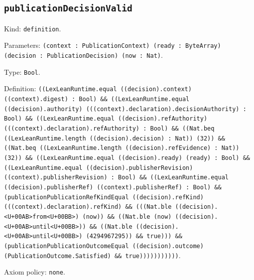 \documentclass[11pt]{article}
\begin{document}
\subsection*{\texttt{publicationDecisionValid}}
\noindent Kind: \texttt{definition}.\par
\noindent Parameters: \texttt{(context : PublicationContext) (ready : ByteArray) (decision : PublicationDecision) (now : Nat)}.\par
\noindent Type: \texttt{Bool}.\par
\noindent Definition: \texttt{((LexLeanRuntime.equal ((decision).context) ((context).digest) : Bool) \&\& ((LexLeanRuntime.equal ((decision).authority) (((context).declaration).decisionAuthority) : Bool) \&\& ((LexLeanRuntime.equal ((decision).refAuthority) (((context).declaration).refAuthority) : Bool) \&\& ((Nat.beq ((LexLeanRuntime.length ((decision).decision) : Nat)) (32)) \&\& ((Nat.beq ((LexLeanRuntime.length ((decision).refEvidence) : Nat)) (32)) \&\& ((LexLeanRuntime.equal ((decision).ready) (ready) : Bool) \&\& ((LexLeanRuntime.equal ((decision).publisherRevision) ((context).publisherRevision) : Bool) \&\& ((LexLeanRuntime.equal ((decision).publisherRef) ((context).publisherRef) : Bool) \&\& (publicationPublicationRefKindEqual ((decision).refKind) (((context).declaration).refKind) \&\& (((Nat.ble ((decision).<U+00AB>from<U+00BB>) (now)) \&\& ((Nat.ble (now) ((decision).<U+00AB>until<U+00BB>)) \&\& ((Nat.ble ((decision).<U+00AB>until<U+00BB>) (4294967295)) \&\& true))) \&\& (publicationPublicationOutcomeEqual ((decision).outcome) (PublicationOutcome.Satisfied) \&\& true)))))))))))}.\par
\noindent Axiom policy: \texttt{none}.\par
\end{document}
